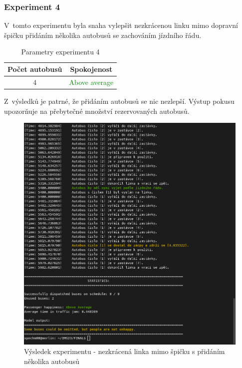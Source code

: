 \documentclass[a4paper]{article}
\begin{document}
            \subsubsection{Experiment 4}
            \label{subsubsec:experiment4}
                V~tomto experimentu byla snaha vylepšit nezkrácenou linku mimo dopravní špičku přidáním několika autobusů se zachováním jízdního řádu. 

                \begin{table}[H]
                	\centering
                	\begin{tabular}{ | c | c |}
                		\hline
                		Počet autobusů & Spokojenost\\
                		\hline
                		\hline
                		4 & \textcolor{green}{Above average} \\
                		\hline
                	\end{tabular}
                	\caption{Parametry experimentu 4}
                	\label{tab:experiment4}
                \end{table}

                Z~výsledků je patrné, že přidáním autobusů se nic nezlepší. Výstup pokusu upozorňuje na přebytečné množství rezervovaných autobusů.

                 \begin{figure}[H]
                \includegraphics[scale=0.37, keepaspectratio]{fig/ims_bus4.png}
                \caption{Výsledek experimentu  - nezkrácená linka mimo špičku s přidáním několika autobusů}
                \label{fig:experiment4}
                    \end{figure}
\end{document}
